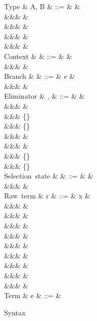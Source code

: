 \begin{figure}
\begin{syntaxfig}
\mbox{Type}
&
A, B
&
::=
&
\tyBool
&
\\
&&&
\tyInt
&
\\
&&&
&
\\
&&&
\tyList{\tyInt}
&
\\
&&&
&
\\[2mm]
\mbox{Context}
&
\Gamma
&
::=
&
\cxtEmpty
&
\\
&&&
&
\\[2mm]
\mbox{Branch}
&
\kappa
&
::=
&
e
&
\\
&&&
\sigma
&
\\[2mm]
\mbox{Eliminator}
&
\sigma, \tau
&
::=
&
&
\\
&&&
&
\\
&&&
\{\exTrue \mapsto \kappa\}
\\
&&&
\{\exFalse \mapsto \kappa\}
\\
&&&
\elimProd{\sigma}
&
\\
&&&
\elimList{\branchNil{\kappa}}{\branchConsNew{\sigma}}
&
\\
&&&
\{\branchNil{\kappa}\}
\\
&&&
\{\branchConsNew{\sigma}\}
\\[2mm]
\mbox{Selection state}
&
\alpha
&
::=
&
\top
&
\\
&&&
\bot
&
\\[2mm]
\mbox{Raw term}
&
r
&
::=
&
x
&
\\
&&&
\exTrue \mid \exFalse
&
\\
&&&
&
\\
&&&
&
\\
&&&
&
\\
&&&
&
\\
&&&
&
\\
&&&
\exNil
&
\\
&&&
&
\\
&&&
&
\\[2mm]
\mbox{Term}
&
e
&
::=
&
\end{syntaxfig}
\caption{Syntax}
\end{figure}

